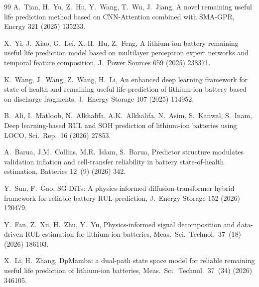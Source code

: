 \begin{thebibliography}{99}
A.~Tian, H.~Yu, Z.~Hu, Y.~Wang, T.~Wu, J.~Jiang,
A novel remaining useful life prediction method based on CNN-Attention combined with SMA-GPR,
Energy 321 (2025) 135233.

X.~Yi, J.~Xiao, G.~Lei, X.-H.~Hu, Z.~Feng,
A lithium-ion battery remaining useful life prediction model based on multilayer perceptron expert networks and temporal feature composition,
J.\ Power Sources 659 (2025) 238371.

K.~Wang, J.~Wang, Z.~Wang, H.~Li,
An enhanced deep learning framework for state of health and remaining useful life prediction of lithium-ion battery based on discharge fragments,
J.\ Energy Storage 107 (2025) 114952.

B.~Ali, I.~Matloob, N.~Alkhalifa, A.K.~Alkhalifa, N.~Asim, S.~Kanwal, S.~Inam,
Deep learning-based RUL and SOH prediction of lithium-ion batteries using LOCO,
Sci.\ Rep.\ 16 (2026) 27853.

A.~Barua, J.M.~Collins, M.R.~Islam, S.~Barua,
Predictor structure modulates validation inflation and cell-transfer reliability in battery state-of-health estimation,
Batteries 12~(9) (2026) 342.

Y.~Sun, F.~Gao,
SG-DiTs: A physics-informed diffusion-transformer hybrid framework for reliable battery RUL prediction,
J.\ Energy Storage 152 (2026) 120479.

Y.~Fan, Z.~Xu, H.~Zhu, Y.~Yu,
Physics-informed signal decomposition and data-driven RUL estimation for lithium-ion batteries,
Meas.\ Sci.\ Technol.\ 37~(18) (2026) 186103.

X.~Li, H.~Zhang,
DpMamba: a dual-path state space model for reliable remaining useful life prediction of lithium-ion batteries,
Meas.\ Sci.\ Technol.\ 37~(34) (2026) 346105.

\end{thebibliography}

